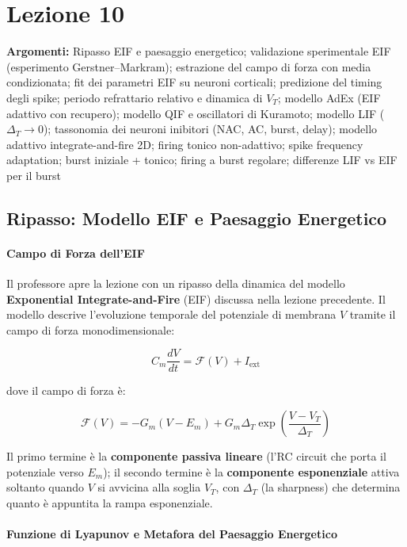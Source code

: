 \chapter{Lezione 10}


\textbf{Argomenti:} Ripasso EIF e paesaggio energetico; validazione sperimentale EIF (esperimento Gerstner–Markram); estrazione del campo di forza con media condizionata; fit dei parametri EIF su neuroni corticali; predizione del timing degli spike; periodo refrattario relativo e dinamica di $V_T$; modello AdEx (EIF adattivo con recupero); modello QIF e oscillatori di Kuramoto; modello LIF ($\Delta_T \to 0$); tassonomia dei neuroni inibitori (NAC, AC, burst, delay); modello adattivo integrate-and-fire 2D; firing tonico non-adattivo; spike frequency adaptation; burst iniziale + tonico; firing a burst regolare; differenze LIF vs EIF per il burst
\section{Ripasso: Modello EIF e Paesaggio Energetico}

\subsubsection{Campo di Forza dell'EIF}

Il professore apre la lezione con un ripasso della dinamica del modello \textbf{Exponential Integrate-and-Fire} (EIF) discussa nella lezione precedente. Il modello descrive l'evoluzione temporale del potenziale di membrana $V$ tramite il campo di forza monodimensionale:

\begin{equation}
C_m \frac{dV}{dt} = \mathcal{F}(V) + I_{\text{ext}}
\end{equation}

dove il campo di forza è:

\begin{equation}
\mathcal{F}(V) = -G_m(V - E_m) + G_m \Delta_T \exp\!\left(\frac{V - V_T}{\Delta_T}\right)
\end{equation}

Il primo termine è la \textbf{componente passiva lineare} (l'RC circuit che porta il potenziale verso $E_m$); il secondo termine è la \textbf{componente esponenziale} attiva soltanto quando $V$ si avvicina alla soglia $V_T$, con $\Delta_T$ (la sharpness) che determina quanto è appuntita la rampa esponenziale.

\subsubsection{Funzione di Lyapunov e Metafora del Paesaggio Energetico}

